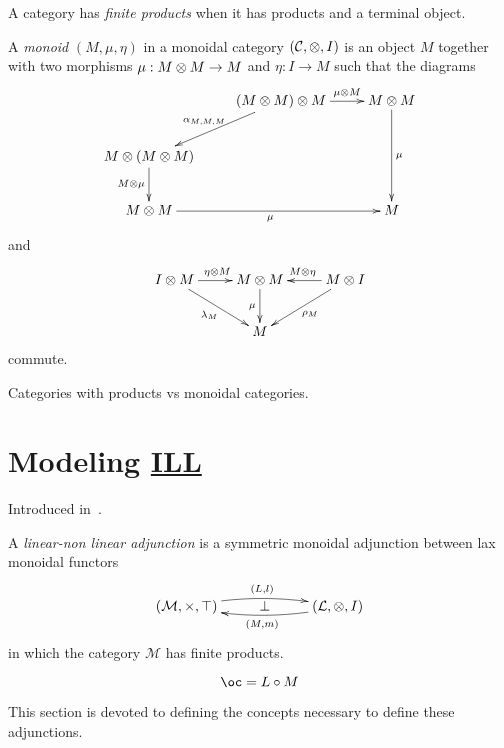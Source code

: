 A category has \emph{finite products} when it has products and a terminal object.

\begin{definition}[Monoid]
A \emph{monoid} $(M,\mu,\eta)$ in a monoidal category $(\mathcal{C},\otimes,I)$ is an object $M$ together with two morphisms $\mu:M\otimes M \to M$ and $\eta:I\to M$
such that the diagrams
\begin{equation*}
\xymatrix{
& (M\tens M)\tens M\ar[dl]_{\alpha_{M,M,M}}\ar[r]^-{\mu\tens M}& M\tens M\ar[dd]^{\mu}\\
M\tens(M\tens M)\ar[d]_{M\tens\mu}& & \\
M\tens M\ar[rr]_{\mu}& & M\\
}
\end{equation*}
and
\begin{equation*}
\xymatrix{
I\tens M\ar[r]^{\eta\tens M}\ar[dr]_{\lambda_M}& M\tens M\ar[d]_\mu& \ar[l]_{M\tens\eta}\ar[dl]^{\rho_M}M\tens I\\
& M& 
}
\end{equation*}
commute.
\end{definition}

\begin{property}
Categories with products vs monoidal categories.
\end{property}



\section{\texorpdfstring{Modeling \hyperref[intuitionistic-linear-logic]{ILL}}{Modeling ILL}}\label{modeling-ill}

Introduced in~\cite{mixedlnll}.

\begin{definition}
A \emph{linear-non linear adjunction} is a symmetric monoidal adjunction between lax monoidal functors
\begin{equation*}
\xymatrix{
(\mathcal{M},\times,\top)\ar@/^/[rr]^{(L,l)}& \bot& \ar@/^/[ll]^{(M,m)}(\mathcal{L},\otimes,I)
}
\end{equation*}
in which the category $\mathcal{M}$ has finite products.
\end{definition}

\[\oc=L\circ M\]

This section is devoted to defining the concepts necessary to define
these adjunctions.

